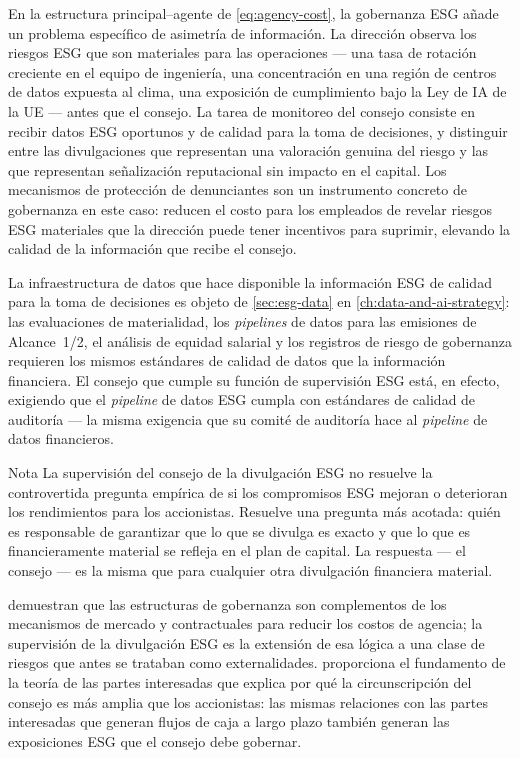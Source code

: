 En la estructura principal--agente de \cref{eq:agency-cost}, la gobernanza ESG añade un problema específico de asimetría de información. La dirección observa los riesgos ESG que son materiales para las operaciones --- una tasa de rotación creciente en el equipo de ingeniería, una concentración en una región de centros de datos expuesta al clima, una exposición de cumplimiento bajo la Ley de IA de la UE --- antes que el consejo. La tarea de monitoreo del consejo consiste en recibir datos ESG oportunos y de calidad para la toma de decisiones, y distinguir entre las divulgaciones que representan una valoración genuina del riesgo y las que representan señalización reputacional sin impacto en el capital. Los mecanismos de protección de denunciantes son un instrumento concreto de gobernanza en este caso: reducen el costo para los empleados de revelar riesgos ESG materiales que la dirección puede tener incentivos para suprimir, elevando la calidad de la información que recibe el consejo.

La infraestructura de datos que hace disponible la información ESG de calidad para la toma de decisiones es objeto de \cref{sec:esg-data} en \cref{ch:data-and-ai-strategy}: las evaluaciones de materialidad, los \emph{pipelines} de datos para las emisiones de Alcance~1/2, el análisis de equidad salarial y los registros de riesgo de gobernanza requieren los mismos estándares de calidad de datos que la información financiera. El consejo que cumple su función de supervisión ESG está, en efecto, exigiendo que el \emph{pipeline} de datos ESG cumpla con estándares de calidad de auditoría --- la misma exigencia que su comité de auditoría hace al \emph{pipeline} de datos financieros.

\begin{admonition}{Nota}
La supervisión del consejo de la divulgación ESG no resuelve la controvertida pregunta empírica de si los compromisos ESG mejoran o deterioran los rendimientos para los accionistas. Resuelve una pregunta más acotada: quién es responsable de garantizar que lo que se divulga es exacto y que lo que es financieramente material se refleja en el plan de capital. La respuesta --- el consejo --- es la misma que para cualquier otra divulgación financiera material.
\end{admonition}

\textcite{jensen1976agency} demuestran que las estructuras de gobernanza son complementos de los mecanismos de mercado y contractuales para reducir los costos de agencia; la supervisión de la divulgación ESG es la extensión de esa lógica a una clase de riesgos que antes se trataban como externalidades. \textcite{freeman2010strategic} proporciona el fundamento de la teoría de las partes interesadas que explica por qué la circunscripción del consejo es más amplia que los accionistas: las mismas relaciones con las partes interesadas que generan flujos de caja a largo plazo también generan las exposiciones ESG que el consejo debe gobernar.
